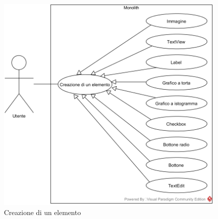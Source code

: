 \begin{samepage}
\nopagebreak
\begin{figure}[H]
	\centering
	\includegraphics[width=15cm]{../../documenti/AnalisiDeiRequisiti/Diagrammi_img/creazione_elem.png}
	\caption{\UCFCaption{} Creazione di un elemento}
\end{figure}
\end{samepage}

